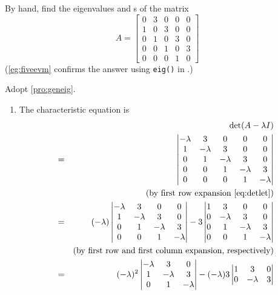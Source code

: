 \begin{example} \label{eg:fiveev}
By hand, find the eigenvalues and s of the matrix
\begin{equation*}
A=\begin{bmatrix}0&3&0&0&0
\\1&0&3&0&0
\\0&1&0&3&0
\\0&0&1&0&3
\\0&0&0&1&0\end{bmatrix}
\end{equation*}
(\autoref{eg:fiveevm} confirms the answer using \verb|eig()| in \script.)
\begin{solution} 
Adopt \autoref{pro:geneig}.
\begin{enumerate}
\item The characteristic equation is
\begin{eqnarray*}
&&\det(A-\lambda I)
\\&=&\begin{vmatrix}-\lambda&3&0&0&0
\\1&-\lambda&3&0&0
\\0&1&-\lambda&3&0
\\0&0&1&-\lambda&3
\\0&0&0&1&-\lambda\end{vmatrix}
\\&&(\text{by first row expansion~\eqref{eq:detlet}})
\\&=&(-\lambda)\begin{vmatrix}-\lambda&3&0&0
\\1&-\lambda&3&0
\\0&1&-\lambda&3
\\0&0&1&-\lambda\end{vmatrix}
-3\begin{vmatrix}1&3&0&0
\\0&-\lambda&3&0
\\0&1&-\lambda&3
\\0&0&1&-\lambda\end{vmatrix}
\\&&(\text{by first row and first column expansion, respectively})
\\&=&(-\lambda)^2\begin{vmatrix}-\lambda&3&0
\\1&-\lambda&3
\\0&1&-\lambda\end{vmatrix}
-(-\lambda)3\begin{vmatrix}1&3&0
\\0&-\lambda&3

\end{vmatrix}
\end{eqnarray*}
\end{enumerate}
\end{solution}
\end{example}
